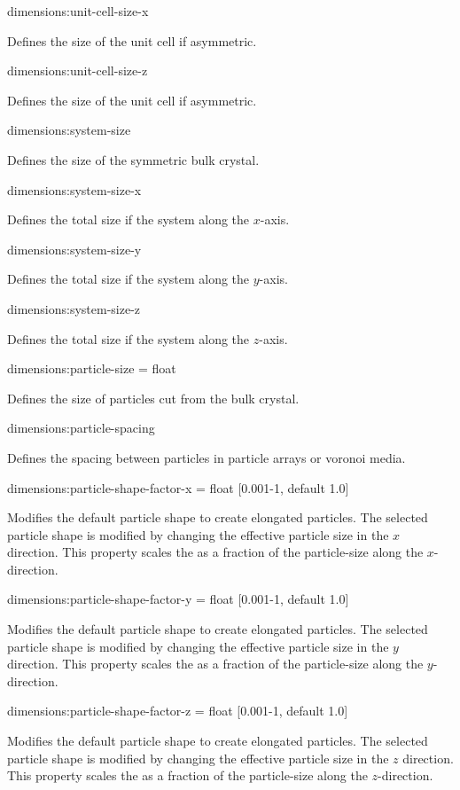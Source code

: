 {\zicf dimensions:unit-cell-size-x} Defines the size of the unit cell if asymmetric.

{\zicf dimensions:unit-cell-size-z} Defines the size of the unit cell if asymmetric.

{\zicf dimensions:system-size} Defines the size of the symmetric bulk crystal.

{\zicf dimensions:system-size-x} Defines the total size if the system along the $x$-axis.

{\zicf dimensions:system-size-y} Defines the total size if the system along the $y$-axis.

{\zicf dimensions:system-size-z} Defines the total size if the system along the $z$-axis.

{\zicf dimensions:particle-size = float} Defines the size of particles cut from the bulk crystal.

{\zicf dimensions:particle-spacing} Defines the spacing between particles in particle arrays or voronoi media.


{\zicf dimensions:particle-shape-factor-x = float [0.001-1, default 1.0]}  Modifies the default particle shape to create elongated particles. The selected particle shape is modified by changing the effective particle size in the $x$ direction. This property scales the as a fraction of the particle-size along the $x$-direction.

{\zicf dimensions:particle-shape-factor-y = float [0.001-1, default 1.0]}  Modifies the default particle shape to create elongated particles. The selected particle shape is modified by changing the effective particle size in the $y$ direction. This property scales the as a fraction of the particle-size along the $y$-direction.

{\zicf dimensions:particle-shape-factor-z = float [0.001-1, default 1.0]} Modifies the default particle shape to create elongated particles. The selected particle shape is modified by changing the effective particle size in the $z$ direction. This property scales the as a fraction of the particle-size along the $z$-direction.

